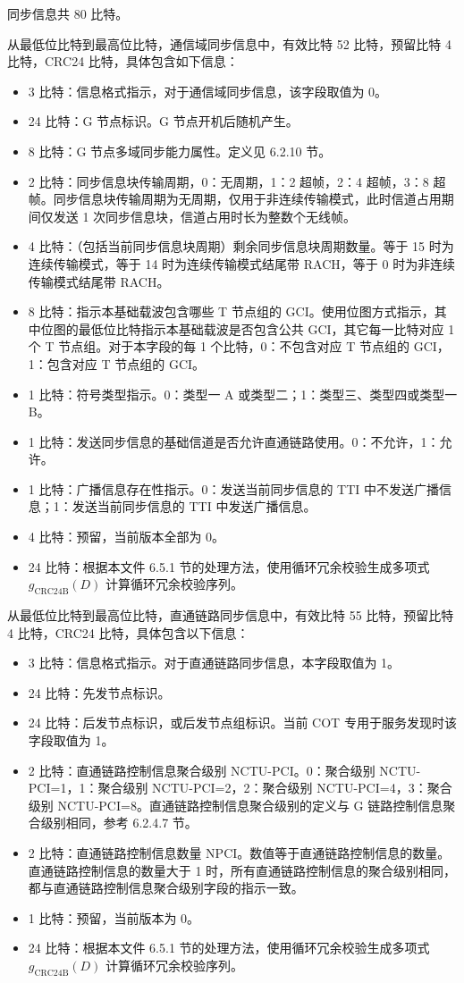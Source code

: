 \documentclass[11pt,a4paper]{ctexart}
\begin{document}
同步信息共 80 比特。

从最低位比特到最高位比特，通信域同步信息中，有效比特 52 比特，预留比特 4 比特，CRC24 比特，具体包含如下信息：
\begin{itemize}[nosep]
  \item 3 比特：信息格式指示，对于通信域同步信息，该字段取值为 0。
  \item 24 比特：G 节点标识。G 节点开机后随机产生。
  \item 8 比特：G 节点多域同步能力属性。定义见 6.2.10 节。
  \item 2 比特：同步信息块传输周期，0：无周期，1：2 超帧，2：4 超帧，3：8 超帧。同步信息块传输周期为无周期，仅用于非连续传输模式，此时信道占用期间仅发送 1 次同步信息块，信道占用时长为整数个无线帧。
  \item 4 比特：（包括当前同步信息块周期）剩余同步信息块周期数量。等于 15 时为连续传输模式，等于 14 时为连续传输模式结尾带 RACH，等于 0 时为非连续传输模式结尾带 RACH。
  \item 8 比特：指示本基础载波包含哪些 T 节点组的 GCI。使用位图方式指示，其中位图的最低位比特指示本基础载波是否包含公共 GCI，其它每一比特对应 1 个 T 节点组。对于本字段的每 1 个比特，0：不包含对应 T 节点组的 GCI，1：包含对应 T 节点组的 GCI。
  \item 1 比特：符号类型指示。0：类型一 A 或类型二；1：类型三、类型四或类型一 B。
  \item 1 比特：发送同步信息的基础信道是否允许直通链路使用。0：不允许，1：允许。
  \item 1 比特：广播信息存在性指示。0：发送当前同步信息的 TTI 中不发送广播信息；1：发送当前同步信息的 TTI 中发送广播信息。
  \item 4 比特：预留，当前版本全部为 0。
  \item 24 比特：根据本文件 6.5.1 节的处理方法，使用循环冗余校验生成多项式 $g_{\mathrm{CRC24B}}(D)$ 计算循环冗余校验序列。
\end{itemize}

从最低位比特到最高位比特，直通链路同步信息中，有效比特 55 比特，预留比特 4 比特，CRC24 比特，具体包含以下信息：
\begin{itemize}[nosep]
  \item 3 比特：信息格式指示。对于直通链路同步信息，本字段取值为 1。
  \item 24 比特：先发节点标识。
  \item 24 比特：后发节点标识，或后发节点组标识。当前 COT 专用于服务发现时该字段取值为 1。
  \item 2 比特：直通链路控制信息聚合级别 NCTU-PCI。0：聚合级别 NCTU-PCI=1，1：聚合级别 NCTU-PCI=2，2：聚合级别 NCTU-PCI=4，3：聚合级别 NCTU-PCI=8。直通链路控制信息聚合级别的定义与 G 链路控制信息聚合级别相同，参考 6.2.4.7 节。
  \item 2 比特：直通链路控制信息数量 NPCI。数值等于直通链路控制信息的数量。直通链路控制信息的数量大于 1 时，所有直通链路控制信息的聚合级别相同，都与直通链路控制信息聚合级别字段的指示一致。
  \item 1 比特：预留，当前版本为 0。
  \item 24 比特：根据本文件 6.5.1 节的处理方法，使用循环冗余校验生成多项式 $g_{\mathrm{CRC24B}}(D)$ 计算循环冗余校验序列。
\end{itemize}
\end{document}
